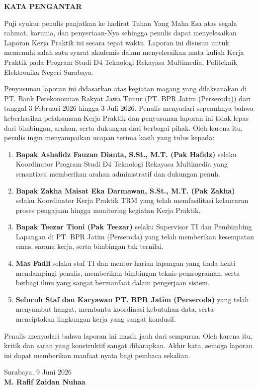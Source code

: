 \begin{center}
    {\fontsize{12pt}{14pt}\selectfont\textbf{KATA PENGANTAR}\par}
    \vspace{0.4cm}
\end{center}

Puji syukur penulis panjatkan ke hadirat Tuhan Yang Maha Esa atas segala rahmat, karunia, dan penyertaan-Nya sehingga penulis dapat menyelesaikan Laporan Kerja Praktik ini secara tepat waktu. Laporan ini disusun untuk memenuhi salah satu syarat akademis dalam menyelesaikan mata kuliah Kerja Praktik pada Program Studi D4 Teknologi Rekayasa Multimedia, Politeknik Elektronika Negeri Surabaya.

Penyusunan laporan ini didasarkan atas kegiatan magang yang dilaksanakan di PT. Bank Perekonomian Rakyat Jawa Timur (PT. BPR Jatim (Perseroda)) dari tanggal 3 Februari 2026 hingga 3 Juli 2026. Penulis menyadari sepenuhnya bahwa keberhasilan pelaksanaan Kerja Praktik dan penyusunan laporan ini tidak lepas dari bimbingan, arahan, serta dukungan dari berbagai pihak. Oleh karena itu, penulis ingin menyampaikan ucapan terima kasih yang tulus kepada:

\begin{enumerate}[label=\arabic*), leftmargin=*]
    \item \textbf{Bapak Ashafidz Fauzan Dianta, S.St., M.T. (Pak Hafidz)} selaku Koordinator Program Studi D4 Teknologi Rekayasa Multimedia yang senantiasa memberikan arahan administratif dan dukungan penuh.
    \item \textbf{Bapak Zakha Maisat Eka Darmawan, S.St., M.T. (Pak Zakha)} selaku Koordinator Kerja Praktik TRM yang telah memfasilitasi kelancaran proses pengajuan hingga monitoring kegiatan Kerja Praktik.
    \item \textbf{Bapak Teezar Tioni (Pak Teezar)} selaku Supervisor TI dan Pembimbing Lapangan di PT. BPR Jatim (Perseroda) yang telah memberikan kesempatan emas, sarana kerja, serta bimbingan tak ternilai.
    \item \textbf{Mas Fadli} selaku staf TI dan mentor harian lapangan yang tiada henti mendampingi penulis, memberikan bimbingan teknis pemrograman, serta berbagi ilmu yang sangat bermanfaat dalam pengerjaan sistem.
    \item \textbf{Seluruh Staf dan Karyawan PT. BPR Jatim (Perseroda)} yang telah menyambut hangat, membantu koordinasi kebutuhan data, serta menciptakan lingkungan kerja yang sangat kondusif.
\end{enumerate}

Penulis menyadari bahwa laporan ini masih jauh dari sempurna. Oleh karena itu, kritik dan saran yang konstruktif sangat diharapkan. Akhir kata, semoga laporan ini dapat memberikan manfaat nyata bagi pembaca sekalian.

\vspace{0.4cm}
\begin{flushright}
Surabaya, 9 Juni 2026\\[1.2cm]
\textbf{M. Rafif Zaidan Nuhaa}
\end{flushright}
\newpage
